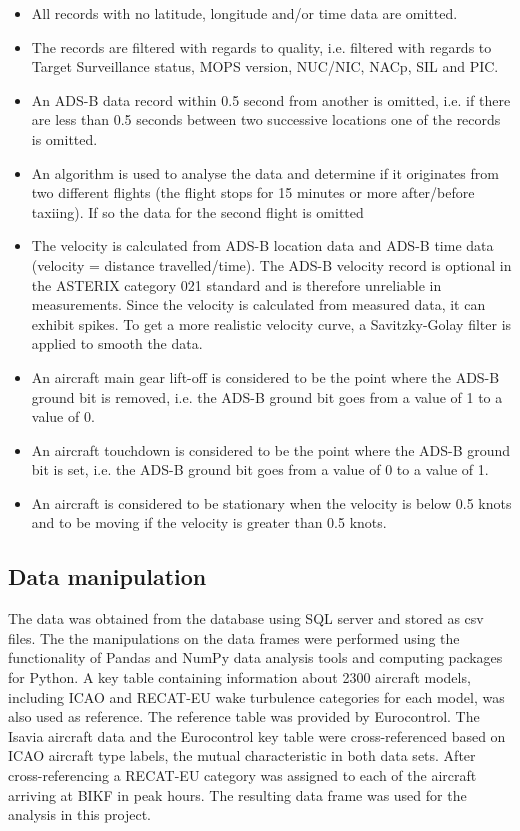 \begin{itemize}
    \item All records with no latitude, longitude and/or time data are omitted.
    \item The records are filtered with regards to quality, i.e. filtered with regards to Target Surveillance status, MOPS version, NUC/NIC, NACp, SIL and PIC.
    \item An ADS-B data record within 0.5 second from another is omitted, i.e. if there are less than 0.5 seconds between two successive locations one of the records is omitted.
    \item An algorithm is used to analyse the data and determine if it originates from two different flights (the flight stops for 15 minutes or more after/before taxiing). If so the data for the second flight is omitted
    \item The velocity is calculated from ADS-B location data and ADS-B time data (velocity = distance travelled/time). The ADS-B velocity record is optional in the ASTERIX category 021 standard and is therefore unreliable in measurements. Since the velocity is calculated from measured data, it can exhibit spikes. To get a more realistic velocity curve, a Savitzky-Golay filter is applied to smooth the data.
    \item An aircraft main gear lift-off is considered to be the point where the ADS-B ground bit is removed, i.e. the ADS-B ground bit goes from a value of 1 to a value of 0.
    \item An aircraft touchdown is considered to be the point where the ADS-B ground bit is set, i.e. the ADS-B ground bit goes from a value of 0 to a value of 1.
    \item An aircraft is considered to be stationary when the velocity is below 0.5 knots and to be moving if the velocity is greater than 0.5 knots.
    \cite{isavia_wiki}
\end{itemize}


\subsection{Data manipulation}
The data was obtained from the database using SQL server and stored as csv files. The the manipulations on the data frames were performed using the functionality of Pandas and NumPy data analysis tools and computing packages for Python. A key table containing information about 2300 aircraft models, including ICAO and RECAT-EU wake turbulence categories for each model, was also used as reference. The reference table was provided by Eurocontrol. The Isavia aircraft data and the Eurocontrol key table were cross-referenced based on ICAO aircraft type labels, the mutual characteristic in both data sets. After cross-referencing a RECAT-EU category was assigned to each of the aircraft arriving at BIKF in peak hours. The resulting data frame was used for the analysis in this project. 

